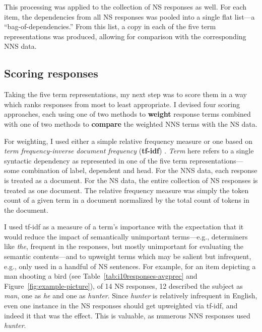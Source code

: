 This processing was applied to the collection of NS responses as well. For each item, the dependencies from all NS responses was pooled into a single flat list---a ``bag-of-dependencies.'' From this list, a copy in each of the five term representations was produced, allowing for comparison with the corresponding NNS data.


\subsection{Scoring responses}
\label{sec:scoring}

Taking the five term representations, my next
step was to score them in a way which ranks responses from most to
least appropriate.  I devised four scoring approaches, each
using one of two methods to \textbf{weight} response terms combined
with one of two methods to \textbf{compare} the weighted NNS terms
with the NS data.

For weighting, I used either a simple relative frequency measure
or one based on \textit{term frequency-inverse document frequency} (\textbf{tf-idf})
\citep[][ch. 6]{manning-et-al:08}. \textit{Term} here refers to a single syntactic dependency as represented in one of the five term representations---some combination of label, dependent and head. For the NNS data, each response is treated as a document. For the NS data, the entire collection of NS responses is treated as one document. The relative frequency measure was simply the token count of a given term in a document normalized by the total count of tokens in the document.

I used tf-idf as a measure of a term's importance with the expectation that it would reduce the impact
of semantically unimportant terms---e.g., determiners like
\textit{the}, frequent in the responses, but mostly unimportant for evaluating the
semantic contents---and to upweight terms which may
be salient but infrequent, e.g., only used in a handful of NS
sentences. For example, for an item depicting a man shooting a bird
(see Table~\ref{tab:i10responses-avgprec} and Figure~\ref{fig:example-picture}), of 14 NS responses, 12 described the subject as \textit{man}, one as \textit{he} and one as
\textit{hunter}. Since \textit{hunter} is relatively infrequent in English, even
one instance in the NS responses should get upweighted via tf-idf, and indeed it
that was the effect. This is valuable, as numerous NNS responses used \textit{hunter}.

